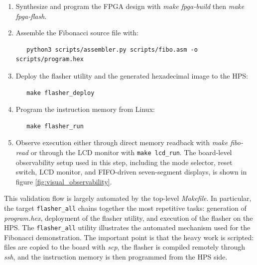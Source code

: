\documentclass[a4paper,11pt]{scrartcl}
\begin{document}
\begin{enumerate}
\item Synthesize and program the FPGA design with \emph{make fpga-build} then \emph{make fpga-flash}.
\item Assemble the Fibonacci source file with:

\begin{verbatim}
   python3 scripts/assembler.py scripts/fibo.asm -o scripts/program.hex
\end{verbatim}

\item Deploy the flasher utility and the generated hexadecimal image to the HPS:

\begin{verbatim}
   make flasher_deploy
\end{verbatim}

\item Program the instruction memory from Linux:

\begin{verbatim}
   make flasher_run
\end{verbatim}

\item Observe execution either through direct memory readback with \emph{make fibo-read} or through the LCD monitor with \texttt{make lcd\_run}. The board-level observability setup used in this step, including the mode selector, reset switch, LCD monitor, and FIFO-driven seven-segment displays, is shown in figure \ref{fig:visual_observability}.
\end{enumerate}

This validation flow is largely automated by the top-level \emph{Makefile}. In particular, the target \texttt{flasher\_all} chains together the most repetitive tasks: generation of \emph{program.hex}, deployment of the flasher utility, and execution of the flasher on the HPS. The \texttt{flasher\_all} utility illustrates the automated mechanism used for the Fibonacci demonstration. The important point is that the heavy work is scripted: files are copied to the board with \emph{scp}, the flasher is compiled remotely through \emph{ssh}, and the instruction memory is then programmed from the HPS side.
\end{document}
